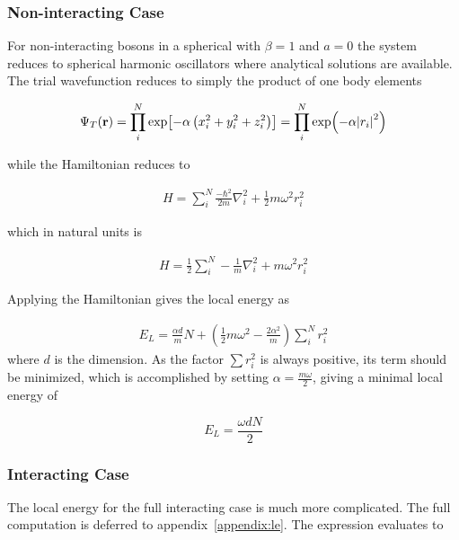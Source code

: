 \subsubsection{Non-interacting Case}
For non-interacting bosons in a spherical with \(\beta = 1\) and \(a = 0\) the
system reduces to spherical harmonic oscillators where analytical solutions are
available. The trial wavefunction reduces to simply the product of one body
elements

\newcommand{\psit}{\Psi_T(\vb{r})}
\newcommand{\onebody}{\prod_{i}^{N}\exp{-\alpha\left[\left( x_i^2 + y_i^2 + \beta
      z_i^2\right)\right]}}
\begin{align*}
  \psit = \prod_{i}^{N}\exp[-\alpha\left( x_{i}^{2}+y_{i}^{2}+z_{i}^{2} \right)] = \prod_{i}^{N}\exp(-\alpha \abs{r_{i}}^{2})
\end{align*}

while the Hamiltonian reduces to

\begin{align*}
  H = \sum_{i}^{N} \frac{-\hbar^{2}}{2m}\nabla_{i}^{2} + \frac{1}{2}m\omega^{2}r_{i}^{2}
\end{align*}

which in natural units is

\newcommand{\lapl}[1]{\nabla_{#1}^2}
\begin{align*}
  H = \frac{1}{2}\sum_{i}^{N} -\frac{1}{m}\lapl{i} + m\omega^{2}r_{i}^{2}
\end{align*}

Applying the Hamiltonian gives the local energy as

\begin{align*}
  E_{L} = \frac{\alpha d}{m} N + \left( \frac{1}{2}m\omega^{2} - \frac{2\alpha^{2}}{m} \right)\sum_{i}^{N}r_{i}^{2}
\end{align*}
 where \(d\) is the dimension. As the factor \(\sum r_{i}^{2}\) is always
 positive, its term should be minimized, which is accomplished by setting
 \(\alpha = \frac{m\omega}{2}\), giving a minimal local energy of

 \begin{equation}
   E_{L} = \frac{\omega d N}{2}
   \label{eq:noninteracting}
 \end{equation}

\subsubsection{Interacting Case}
The local energy for the full interacting case is much more complicated. The
full computation is deferred to appendix~\ref{appendix:le}. The expression
evaluates to

